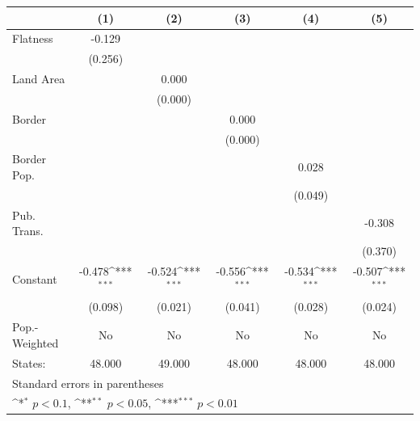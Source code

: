 {
\def\sym#1{\ifmmode^{#1}\else\(^{#1}\)\fi}
\begin{tabular}{l*{5}{c}}
\hline\hline
            &\multicolumn{1}{c}{(1)}         &\multicolumn{1}{c}{(2)}         &\multicolumn{1}{c}{(3)}         &\multicolumn{1}{c}{(4)}         &\multicolumn{1}{c}{(5)}         \\
\hline
Flatness    &      -0.129         &                     &                     &                     &                     \\
            &     (0.256)         &                     &                     &                     &                     \\
[1em]
Land Area   &                     &       0.000         &                     &                     &                     \\
            &                     &     (0.000)         &                     &                     &                     \\
[1em]
Border      &                     &                     &       0.000         &                     &                     \\
            &                     &                     &     (0.000)         &                     &                     \\
[1em]
Border Pop. &                     &                     &                     &       0.028         &                     \\
            &                     &                     &                     &     (0.049)         &                     \\
[1em]
Pub. Trans. &                     &                     &                     &                     &      -0.308         \\
            &                     &                     &                     &                     &     (0.370)         \\
[1em]
Constant    &      -0.478\sym{***}&      -0.524\sym{***}&      -0.556\sym{***}&      -0.534\sym{***}&      -0.507\sym{***}\\
            &     (0.098)         &     (0.021)         &     (0.041)         &     (0.028)         &     (0.024)         \\
\hline
Pop.-Weighted&          No         &          No         &          No         &          No         &          No         \\
States:     &      48.000         &      49.000         &      48.000         &      48.000         &      48.000         \\
\hline\hline
\multicolumn{6}{l}{\footnotesize Standard errors in parentheses}\\
\multicolumn{6}{l}{\footnotesize \sym{*} \(p<0.1\), \sym{**} \(p<0.05\), \sym{***} \(p<0.01\)}\\
\end{tabular}
}
